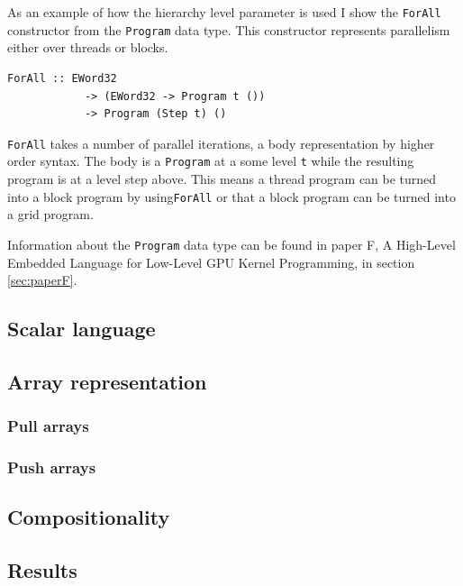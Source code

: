 \documentclass[a4paper]{book}
\newcommand{\paperFTitle}{A High-Level Embedded Language for Low-Level GPU Kernel Programming}
\begin{document}
As an example of how the hierarchy level parameter is used I show the {\tt ForAll} constructor 
from the {\tt Program} data type.  This constructor represents parallelism either over threads 
or blocks. 

\begin{verbatim}
ForAll :: EWord32 
            -> (EWord32 -> Program t ())
            -> Program (Step t) ()
\end{verbatim}

{\tt ForAll} takes a number of parallel iterations, a body representation by higher order 
syntax. The body is a {\tt Program} at a some level {\tt t} while the resulting program 
is at a level step above. This means a thread program can be turned into a block program 
by using{\tt ForAll} or that a block program can be turned into a grid program. 

Information about the {\tt Program} data type can be found in paper F, \paperFTitle, in 
section \ref{sec:paperF}. 


\subsection{Scalar language}

\subsection{Array representation}

\subsubsection{Pull arrays}
 
\subsubsection{Push arrays}


\subsection{Compositionality} 

\subsection{Results}
\end{document}
